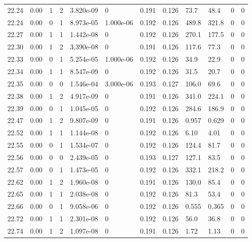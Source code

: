 \documentclass[preview]{standalone}
\begin{document}
{{{{{{{{{{{{{{{{{{\begin{tabular}{L{1.2cm}C{1.2cm} C{0.3cm}C{0.5cm} C{1.4cm}C{1.4cm} C{1.4cm}C{1.4cm} C{1.6cm}C{1.6cm} C{1.6cm}C{1.6cm}}
  22.24  &  0.00  & 1     &  2 &  3.820e-09  & 0  &  0.191&   0.126& 73.7 & 48.4   &  0 & 0  \\ 
  22.24  &  0.00  & 0     &  1 &  8.973e-05  & 1.000e-06  &  0.192&   0.126& 489.8 & 321.8   &  0 & 0  \\ 
  22.27  &  0.00  & 1     &  1 &  1.442e-08  & 0  &  0.192&   0.126& 270.1 & 177.5   &  0 & 0  \\ 
  22.30  &  0.00  & 1     &  2 &  3.390e-08  & 0  &  0.191&   0.126& 117.6 & 77.3   &  0 & 0  \\ 
  22.33  &  0.00  & 0     &  1 &  5.254e-05  & 1.000e-06  &  0.192&   0.126& 34.9 & 22.9   &  0 & 0  \\ 
  22.34  &  0.00  & 1     &  1 &  8.547e-09  & 0  &  0.192&   0.126& 31.5 & 20.7   &  0 & 0  \\ 
  22.35  &  0.00  & 0     &  0 &  1.546e-04  & 3.000e-06  &  0.193&   0.127& 106.0 & 69.6   &  0 & 0  \\ 
  22.38  &  0.00  & 1     &  2 &  4.917e-09  & 0  &  0.191&   0.126& 341.0 & 224.1   &  0 & 0  \\ 
  22.39  &  0.00  & 0     &  1 &  1.045e-05  & 0  &  0.192&   0.126& 284.6 & 186.9   &  0 & 0  \\ 
  22.47  &  0.00  & 1     &  2 &  9.807e-09  & 0  &  0.191&   0.126& 0.957 & 0.629   &  0 & 0  \\ 
  22.52  &  0.00  & 1     &  1 &  1.144e-08  & 0  &  0.192&   0.126& 6.10 & 4.01   &  0 & 0  \\ 
  22.55  &  0.00  & 0     &  1 &  1.534e-07  & 0  &  0.192&   0.126& 124.4 & 81.7   &  0 & 0  \\ 
  22.56  &  0.00  & 0     &  0 &  2.439e-05  & 0  &  0.193&   0.127& 127.1 & 83.5   &  0 & 0  \\ 
  22.57  &  0.00  & 0     &  1 &  1.473e-05  & 0  &  0.192&   0.126& 332.1 & 218.2   &  0 & 0  \\ 
  22.62  &  0.00  & 1     &  2 &  1.960e-08  & 0  &  0.191&   0.126& 130.0 & 85.4   &  0 & 0  \\ 
  22.65  &  0.00  & 1     &  1 &  2.038e-08  & 0  &  0.192&   0.126& 81.3 & 53.4   &  0 & 0  \\ 
  22.66  &  0.00  & 0     &  1 &  9.058e-06  & 0  &  0.192&   0.126& 0.555 & 0.365   &  0 & 0  \\ 
  22.72  &  0.00  & 1     &  1 &  2.301e-08  & 0  &  0.192&   0.126& 56.0 & 36.8   &  0 & 0  \\ 
  22.74  &  0.00  & 1     &  2 &  1.097e-08  & 0  &  0.191&   0.126& 1.72 & 1.13   &  0 & 0  \\ 

\end{tabular}}}}}}}}}}}}}}}}}}}
\end{document}
